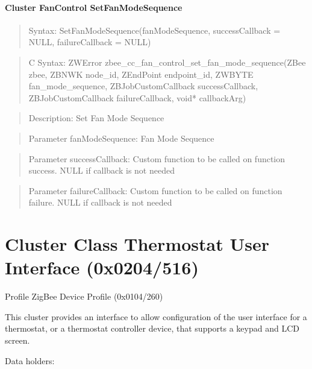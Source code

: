 \paragraph{Cluster FanControl SetFanModeSequence}
\begin{quote}Syntax: SetFanModeSequence(fanModeSequence, successCallback = NULL, failureCallback = NULL)\end{quote}
\begin{quote}C Syntax: ZWError zbee\_cc\_fan\_control\_set\_fan\_mode\_sequence(ZBee zbee, ZBNWK node\_id, ZEndPoint endpoint\_id, ZWBYTE fan\_mode\_sequence, ZBJobCustomCallback successCallback, ZBJobCustomCallback failureCallback, void* callbackArg)\end{quote}
\begin{quote}Description: Set Fan Mode Sequence\end{quote}
\begin{quote}Parameter fanModeSequence: Fan Mode Sequence\end{quote}
\begin{quote}Parameter successCallback: Custom function to be called on function success. NULL if callback is not needed\end{quote}
\begin{quote}Parameter failureCallback: Custom function to be called on function failure. NULL if callback is not needed\end{quote}



\section{Cluster Class Thermostat User Interface (0x0204/516)}

Profile ZigBee Device Profile (0x0104/260)

This cluster provides an interface to allow configuration of the user interface for a thermostat, or a thermostat controller device, that supports a keypad and LCD screen.
\newline

\noindent
Data holders:


